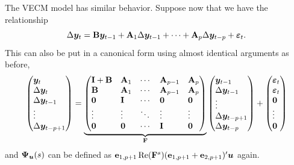 \documentclass[AER,reviewmode]{tex/AEA}
\begin{document}
The VECM model has similar behavior. Suppose now that we have the
relationship
\begin{equation*}
  \Delta \bm{y}_t = \mathbf{B} \bm{y}_{t-1} + \mathbf{A}_1 \Delta \bm{y}_{t-1} + \cdots + \mathbf{A}_p \Delta
  \bm{y}_{t-p} + \bm{\varepsilon}_t.
\end{equation*}
This can also be put in a canonical form using almost identical
arguments as before,
\begin{equation*}
  \begin{pmatrix*}[l]
    \yv_t \\ \Delta \yv_t \\ \Delta \yv_{t-1} \\ \vdots \\ \Delta \yv_{t-p+1}
  \end{pmatrix*}
  =
  \underbrace{\begin{pmatrix*}[l]
    \Imat + \Bm & \Am_1    & \cdots & \Am_{p-1} & \Am_p    \\
    \Bm       & \Am_1    & \cdots & \Am_{p-1} & \Am_p    \\
    \Omat       & \Imat      & \cdots & \Omat       & \Omat      \\
    \vdots  & \vdots & \ddots & \vdots  & \vdots \\
    \Omat       & \Omat      & \cdots & \Imat       & \Omat
  \end{pmatrix*}}_{\Fm}
  \begin{pmatrix*}[l]
    \yv_{t-1} \\ \Delta \yv_{t-1} \\ \vdots \\ \Delta \yv_{t-p+1} \\ \Delta \yv_{t-p}
  \end{pmatrix*}
  +
  \begin{pmatrix*}[l]
    \vepv_t \\ \vepv_t \\ \Ovec \\ \vdots \\ \Ovec
  \end{pmatrix*}
\end{equation*}
and $\bm{\Psi}_{\bm{u}}(s)$ can be defined as
$\mathbf{e}_{1,p+1} \operatorname{Re}(\mathbf{F}^s) (\mathbf{e}_{1,p+1} + \mathbf{e}_{2,p+1})' \bm{u}$ again.
\end{document}
